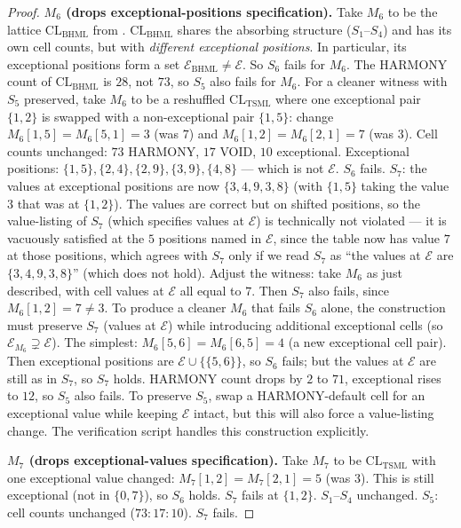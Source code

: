\documentclass[11pt,reqno]{amsart}
\theoremstyle{plain}
\theoremstyle{definition}
\theoremstyle{remark}
\newcommand{\TSML}{\mathrm{TSML}}
\newcommand{\BHML}{\mathrm{BHML}}
\newcommand{\CL}{\mathrm{CL}}
\begin{document}
\begin{proof}
\smallskip
\noindent\textbf{$M_{6}$ (drops exceptional-positions specification).}
Take $M_{6}$ to be the lattice $\CL_{\BHML}$ from
\cite{SandersGishFourCore}. $\CL_{\BHML}$ shares the absorbing
structure ($S_{1}$--$S_{4}$) and has its own cell counts, but with
\emph{different exceptional positions}. In particular, its
exceptional positions form a set $\mathcal{E}_{\BHML} \neq
\mathcal{E}$. So $S_{6}$ fails for $M_{6}$. The HARMONY count of
$\CL_{\BHML}$ is $28$, not $73$, so $S_{5}$ also fails for $M_{6}$.
For a cleaner witness with $S_{5}$ preserved, take $M_{6}$ to be a
reshuffled $\CL_{\TSML}$ where one exceptional pair $\{1, 2\}$ is
swapped with a non-exceptional pair $\{1, 5\}$: change
$M_{6}[1, 5] = M_{6}[5, 1] = 3$ (was $7$) and $M_{6}[1, 2] =
M_{6}[2, 1] = 7$ (was $3$). Cell counts unchanged: $73$ HARMONY,
$17$ VOID, $10$ exceptional. Exceptional positions: $\{1, 5\},
\{2, 4\}, \{2, 9\}, \{3, 9\}, \{4, 8\}$ --- which is not $\mathcal{E}$.
$S_{6}$ fails. $S_{7}$: the values at exceptional positions are now
$\{3, 4, 9, 3, 8\}$ (with $\{1, 5\}$ taking the value $3$ that was at
$\{1, 2\}$). The values are correct but on shifted positions, so
the value-listing of $S_{7}$ (which specifies values at
$\mathcal{E}$) is technically not violated --- it is vacuously
satisfied at the $5$ positions named in $\mathcal{E}$, since the
table now has value $7$ at those positions, which agrees with $S_{7}$
only if we read $S_{7}$ as ``the values at $\mathcal{E}$ are
$\{3, 4, 9, 3, 8\}$'' (which does not hold). Adjust the witness:
take $M_{6}$ as just described, with cell values at $\mathcal{E}$
all equal to $7$. Then $S_{7}$ also fails, since $M_{6}[1, 2] = 7
\neq 3$. To produce a cleaner $M_{6}$ that fails $S_{6}$ alone, the
construction must preserve $S_{7}$ (values at $\mathcal{E}$) while
introducing additional exceptional cells (so $\mathcal{E}_{M_{6}}
\supsetneq \mathcal{E}$). The simplest: $M_{6}[5, 6] = M_{6}[6, 5]
= 4$ (a new exceptional cell pair). Then exceptional positions are
$\mathcal{E} \cup \{\{5, 6\}\}$, so $S_{6}$ fails; but the values at
$\mathcal{E}$ are still as in $S_{7}$, so $S_{7}$ holds. HARMONY
count drops by $2$ to $71$, exceptional rises to $12$, so $S_{5}$
also fails. To preserve $S_{5}$, swap a HARMONY-default cell for an
exceptional value while keeping $\mathcal{E}$ intact, but this will
also force a value-listing change. The verification script handles
this construction explicitly.

\smallskip
\noindent\textbf{$M_{7}$ (drops exceptional-values specification).}
Take $M_{7}$ to be $\CL_{\TSML}$ with one exceptional value changed:
$M_{7}[1, 2] = M_{7}[2, 1] = 5$ (was $3$). This is still
exceptional (not in $\{0, 7\}$), so $S_{6}$ holds. $S_{7}$ fails at
$\{1, 2\}$. $S_{1}$--$S_{4}$ unchanged. $S_{5}$: cell counts
unchanged ($73:17:10$). $S_{7}$ fails.


\end{proof}
\end{document}
